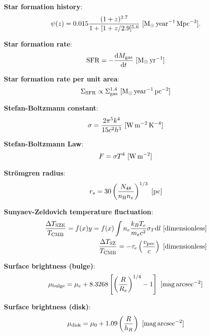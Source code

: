 \documentclass[a4paper,10pt]{article}
\begin{document}
{\noindent}\textbf{Star formation history}:
\begin{align*}
    \psi(z) = 0.015\frac{(1+z)^{2.7}}{1+[1+z/2.9]^{5.6}} ~ [{\rm M_\odot\,year^{-1}\,Mpc^{-3}}].
\end{align*}

{\noindent}\textbf{Star formation rate}:
\begin{align*}
    \mathrm{SFR} = -\frac{\mathrm{d}M_\mathrm{gas}}{\mathrm{d}t} ~ [{\rm M_\odot\,yr^{-1}}]
\end{align*}

{\noindent}\textbf{Star formation rate per unit area}:
\begin{align*}
    \Sigma_\mathrm{SFR} \propto \Sigma_\mathrm{gas}^{1.4} ~ [{\rm M_\odot\,year^{-1}\,pc^{-2}}]
\end{align*}

{\noindent}\textbf{Stefan-Boltzmann constant}:
\begin{align*}
    \sigma = \frac{2\pi^5k^4}{15c^2h^3} ~ [{\rm W\,m^{-2}\,K^{-4}}]
\end{align*}

{\noindent}\textbf{Stefan-Boltzmann Law}:
\begin{align*}
    F = \sigma T^4 ~ [{\rm W\,m^{-2}}]
\end{align*}

{\noindent}\textbf{Str\"omgren radius}:
\begin{align*}
    r_s = 30 \left(\frac{N_{48}}{n_{\rm H}n_e}\right)^{1/3} ~ [{\rm pc}]
\end{align*}

{\noindent}\textbf{Sunyaev-Zeldovich temperature fluctuation}:
\begin{align*}
    \frac{\Delta T_\mathrm{SZE}}{T_\mathrm{CMB}} = f(x)y = f(x)\int n_e\frac{k_BT_e}{m_ec^2}\sigma_T \mathrm{d}l ~ [{\rm dimensionless}] \\
    \frac{\Delta T_\mathrm{SZ}}{T_\mathrm{CMB}} = -\tau_e \left(\frac{v_\mathrm{pec}}{c}\right) ~ [{\rm dimensionless}]
\end{align*}

{\noindent}\textbf{Surface brightness (bulge)}:
\begin{align*}
    \mu_\mathrm{bulge} = \mu_e + 8.3268\left[\left(\frac{R}{R_e}\right)^{1/4}-1\right] ~ [{\rm mag\,arcsec^{-2}}]
\end{align*}

{\noindent}\textbf{Surface brightness (disk)}:
\begin{align*}
    \mu_\mathrm{disk} = \mu_0 + 1.09\left(\frac{R}{h_R}\right) ~ {\rm [mag\,arcsec^{-2}}]
\end{align*}
\end{document}
